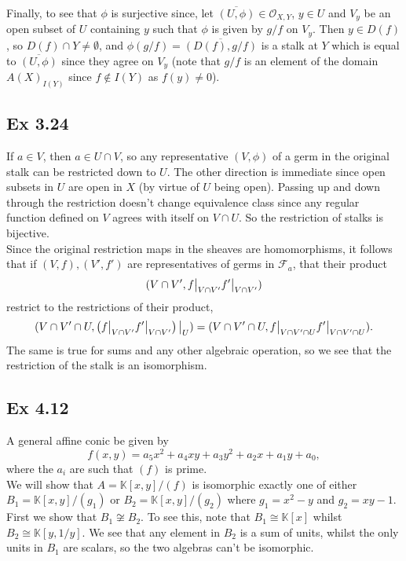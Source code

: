 \documentclass{article}
\newcommand\restr[2]{{%
  \left.\kern-\nulldelimiterspace %
  #1 %
  \vphantom{\big|} %
  \right|_{#2} %
  }}
\theoremstyle{definition}
\newcommand{\K}{\mathbb{K}}
\begin{document}
Finally, to see that $\phi$ is surjective since, let $\overline{(U, \phi)} \in
\mathcal{O}_{X, Y}$, $y \in U$ and $V_y$ be an open subset of $U$ containing
$y$ such that $\phi$ is given by $g/f$ on $V_y$. Then $y \in D(f)$, so $D(f)
\cap Y \not = \emptyset$, and $\phi(g/f) = \overline{(D(f), g/f)}$ is a stalk
at $Y$ which is equal to $\overline{(U, \phi)}$ since they agree on $V_y$ (note
that $g/f$ is an element of the domain $A(X)_{I(Y)}$ since $f \not \in I(Y)$ as
$f(y) \not = 0$).

\subsection*{Ex 3.24} 
If $a \in V$, then $a \in U \cap V$, so any representative $(V, \phi)$ of a
germ in the original stalk can be restricted down to $U$. The other direction
is immediate since open subsets in $U$ are open in $X$ (by virtue of $U$ being
open). Passing up and down through the restriction doesn't change equivalence
class since any regular function defined on $V$ agrees with itself on $V \cap
U$. So the restriction of stalks is bijective. \\

Since the original restriction maps in the sheaves are homomorphisms, it follows
that if $(V, f), (V', f')$ are representatives of germs in $\mathcal{F}_a$,
that their product
\[
	(V \cap V', \restr{f}{V \cap V'}\restr{f'}{V \cap V'})
\]
restrict to the restrictions of their product,
\[
	(V \cap V' \cap U, \restr{\left(\restr{f}{V \cap V'}\restr{f'}{V \cap V'}\right)}{U})
	=
	(V \cap V' \cap U, \restr{f}{V \cap V' \cap U}\restr{f'}{V \cap V' \cap U}).
\]
The same is true for sums and any other algebraic operation, so we see that the
restriction of the stalk is an isomorphism.


\subsection*{Ex 4.12} 

A general affine conic be given by
\[
	f(x, y) 
	=
	a_5 x^{2}
	+
	a_4 xy
	+ 
	a_3 y^{2}
	+
	a_2 x
	+
	a_1 y
	+
	a_0,
\] 
where the $a_i$ are such that $(f)$ is prime. \\

We will show that $A = \K[x,y]/(f)$ is isomorphic exactly one of either $B_1 =
\K[x,y]/(g_1)$ or $B_2 = \K[x, y]/(g_2)$ where $g_1 = x^{2} - y$ and $g_2 = xy
- 1$. \\

First we show that $B_1 \not \cong B_2$. To see this, note that $B_1 \cong
\K[x]$ whilst $B_2 \cong \K[y, 1/y]$. We see that any element in $B_2$ is a sum
of units, whilst the only units in $B_1$ are scalars, so the two algebras can't
be isomorphic. \\
\end{document}
